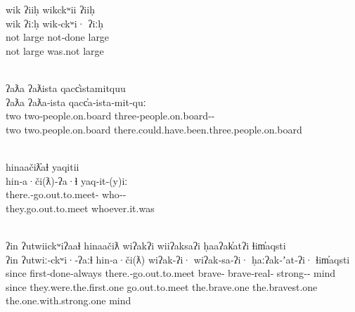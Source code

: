 \begin{exe}
  \glllll wik ʔiiḥ wikckʷii ʔiiḥ\\
          wik           ʔiːḥ           wik‑ckʷi·          ʔiːḥ\\
          not           large          not‑done           large\\
          not           large          was.not            large\\
                               \\
          \vfix

  \glllll ʔaƛa ʔaƛista   qacc̓istamitquu\\
          ʔaƛa           ʔaƛa‑ista           qacc̓a‑ista‑mit‑quː\\
          two            two‑people.on.board three‑people.on.board‑‑\\
          two            two.people.on.board there.could.have.been.three.people.on.board\\
                            \\
          \vfix

  \glllll hinaačiƛ̓aɬ                  yaqitii\\
          hin‑a·či(ƛ)‑ʔa·ɬ                      yaq‑it‑(y)iː\\
          there.‑go.out.to.meet‑ who‑‑\\
          they.go.out.to.meet                   whoever.it.was\\
                                       { }\\
          \vfix

  \glllll ʔin ʔutwiickʷiʔaaɬ hinaačiƛ            wiʔakʔi wiiʔaksaʔi ḥaaʔak̓atʔi      ɬim̓aqsti\\
          ʔin           ʔutwiː‑ckʷi·‑ʔaːɬ        hin‑a·či(ƛ)                   wiʔak‑ʔi·         wiʔak‑sa‑ʔi·         ḥaːʔak‑ʼat‑ʔi·            ɬim̓aqsti\\
          since         first‑done‑always        there.‑go.out.to.meet brave‑    brave‑real‑  strong‑‑ mind\\
          since         they.were.the.first.one  go.out.to.meet                the.brave.one     the.bravest.one      the.one.with.strong.one   mind\\
          { }                                                                                         \\
          \vfix


\end{exe}
